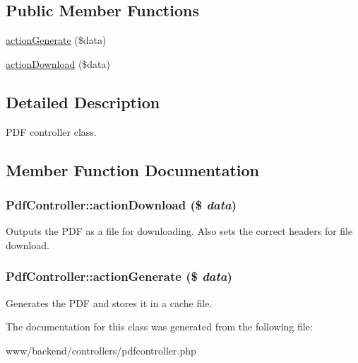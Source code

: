 \subsection*{Public Member Functions}
\begin{DoxyCompactItemize}
\item 
\hyperlink{classPdfController_a2061958c0c59aae44f81d140ff7a9295}{actionGenerate} (\$data)
\item 
\hyperlink{classPdfController_aae2cd40d92a601f3c09f2597211e3c75}{actionDownload} (\$data)
\end{DoxyCompactItemize}


\subsection{Detailed Description}
PDF controller class. 

\subsection{Member Function Documentation}
\hypertarget{classPdfController_aae2cd40d92a601f3c09f2597211e3c75}{
\subsubsection[{actionDownload}]{\setlength{\rightskip}{0pt plus 5cm}PdfController::actionDownload (\$ {\em data})}}
\label{classPdfController_aae2cd40d92a601f3c09f2597211e3c75}
Outputs the PDF as a file for downloading. Also sets the correct headers for file download. \hypertarget{classPdfController_a2061958c0c59aae44f81d140ff7a9295}{
\subsubsection[{actionGenerate}]{\setlength{\rightskip}{0pt plus 5cm}PdfController::actionGenerate (\$ {\em data})}}
\label{classPdfController_a2061958c0c59aae44f81d140ff7a9295}
Generates the PDF and stores it in a cache file. 

The documentation for this class was generated from the following file:\begin{DoxyCompactItemize}
\item 
www/backend/controllers/pdfcontroller.php\end{DoxyCompactItemize}
